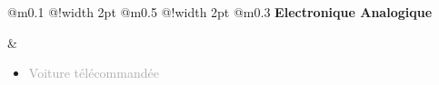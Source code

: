\documentclass{article}
\begin{document}
\begin{tabular}
    {
        @{}m{}
        @{\hspace{0.001\textwidth}}!{\color{secondaryBlue}\vline width 2pt} %
        @{}m{0.5\textwidth}
        @{\hspace{0.025\textwidth}}!{\color{secondaryBlue}\vline width 2pt} %
        @{{\hspace{0.001\textwidth}}}m{0.3\textwidth}
    }
    \textcolor{secondaryBlue}
    {
        \textbf{Electronique Analogique}
    } 

    &
    \begin{itemize}
        [label={}, topsep=8pt, partopsep=0pt, itemsep=0.5pt, parsep=2pt,after=\vspace*{-\baselineskip}]
        \setlength{\itemsep}{10pt}
        \item \textcolor{darkGray}{Voiture télécommandée}
        \begin{itemize}
        [label={\textcolor{gray!80}{\checkmark}}, topsep=8pt, partopsep=0pt, itemsep=0.5pt, parsep=2pt, after=\vspace*{-\baselineskip}] 


\end{itemize}
\end{itemize}
\end{tabular}
\end{document}
